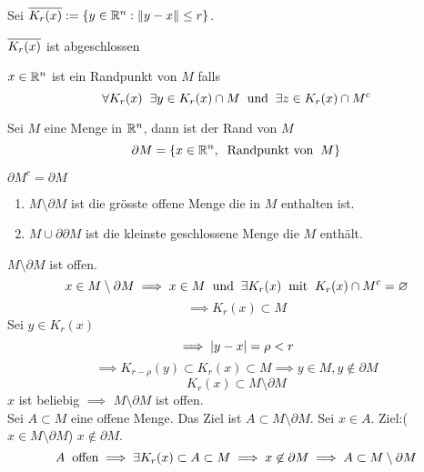 \begin{Def}
  Sei $\overline{K_r(x)}:=\left\{ y\in\mathbb{R}^n:\left\| y-x \right\|\leq r \right\}$.
\end{Def}
\begin{Ueb}
  $\overline{K_r(x)}$ ist abgeschlossen
\end{Ueb}
\begin{Def}
  $x\in\mathbb{R}^n$ ist ein Randpunkt von $M$ falls
  \[\forall K_r(x)\hspace{2mm}\exists y\in K_r(x)\cap M\hspace{2mm}\text{und}\hspace{2mm} \exists z\in K_r(x)\cap M^c\]
\end{Def}
\begin{Def}
  Sei $M$ eine Menge in $\mathbb{R}^n$, dann ist der Rand von $M$
  \[\partial M=\left\{ x\in\mathbb{R}^n, \hspace{2mm}\text{Randpunkt von}\hspace{2mm} M \right\}\]
\end{Def}
\begin{Sat}
  $\partial M^c=\partial M$
  \begin{enumerate}
    \item $M\setminus \partial M$ ist die grösste offene Menge die in $M$ enthalten ist.
    \item $M\cup \partial \partial M$ ist die kleinste geschlossene Menge die $M$ enthält.
  \end{enumerate}
\end{Sat}
\begin{Bew}
  $M\setminus \partial M$ ist offen. 
  \[x\in M\setminus \partial M \implies x\in M\hspace{2mm}\text{und}\hspace{2mm} \exists K_r(x)\hspace{2mm}\text{mit}\hspace{2mm} K_r(x)\cap M^c=\varnothing\]
  \[\implies K_r(x)\subset M\]
  Sei $y\in K_r(x)$
  \[\implies \mathopen| y-x \mathclose|=\rho<r\]
  \[\implies K_{r-\rho}(y)\subset K_r(x)\subset M\implies y\in M,y\not\in \partial M\]
  \[K_r(x)\subset M\setminus \partial M\]
  $x$ ist beliebig $\implies$ $M\setminus \partial M$ ist offen.\\
  Sei $A\subset M$ eine offene Menge. Das Ziel ist $A\subset M\setminus\partial M$. Sei $x\in A$. Ziel:($x\in M\setminus\partial M$) $x\not\in \partial M$.
  \[A\hspace{2mm}\text{offen}\implies \exists K_r(x)\subset A\subset M\implies x\not\in \partial M\implies A\subset M\setminus\partial M\]
\end{Bew}
